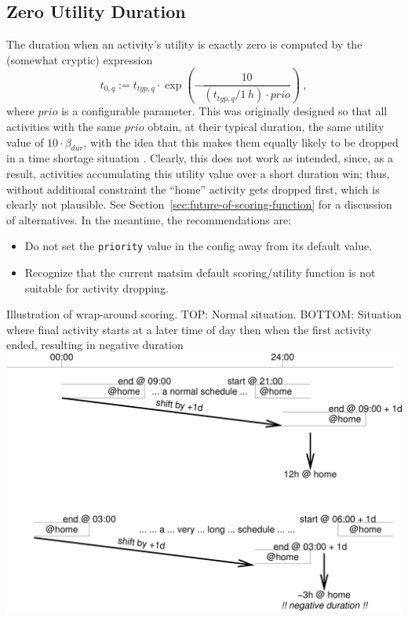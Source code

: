 \subsection{Zero Utility Duration}
\label{sec:zero-util-durat}

The duration when an activity's utility is exactly zero is computed by the (somewhat cryptic) expression
\begin{equation}
t_{0,q} := t_{typ,q} \cdot \exp\left( - \frac{10}{(t_{typ,q}/1\,h) \cdot prio} \right) \ ,
\label{eq:zero-utility-duration}  
\end{equation}
where $prio$ is a configurable parameter. This was originally designed so that all activities with the same $prio$ obtain, at their typical duration, the same utility value of $10 \cdot \beta_{dur}$, with the idea that this makes them equally likely to be dropped in a time shortage situation \citep{CharyparNagel2005ga4acts}. Clearly, this does not work as intended, since, as a result, activities accumulating this utility value over a short duration win; thus, without additional constraint the ``home'' activity gets dropped first, which is clearly not plausible. See Section~\ref{sec:future-of-scoring-function} for a discussion of alternatives. In the meantime, the recommendations are:
\begin{itemize}\styleItemize
\item Do not set the \lstinline$priority$ value in the config away from its default value.
\item Recognize that the current \gls{matsim} default scoring/utility function is not suitable for activity dropping.
\end{itemize}


%
{Illustration of wrap-around scoring. TOP: Normal situation. BOTTOM: Situation where final activity starts at a later time of day then when the first activity ended, resulting in negative duration}%
{\label{tab:negative-durations}}%
{\includegraphics[width=0.8\hsize,trim=0 0 0 0,clip]{using/figures/negative-duration}}%
{}

